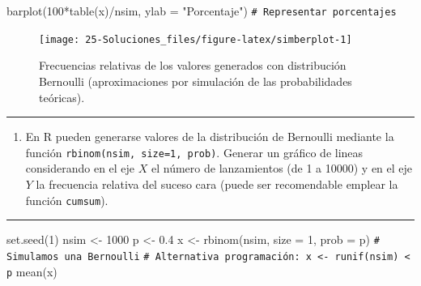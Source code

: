\documentclass[
]{book}
\newenvironment{Shaded}{\begin{snugshade}}{\end{snugshade}}
\newcommand{\AttributeTok}[1]{\textcolor[rgb]{0.77,0.63,0.00}{#1}}
\newcommand{\CommentTok}[1]{\textcolor[rgb]{0.56,0.35,0.01}{\textit{#1}}}
\newcommand{\DecValTok}[1]{\textcolor[rgb]{0.00,0.00,0.81}{#1}}
\newcommand{\FloatTok}[1]{\textcolor[rgb]{0.00,0.00,0.81}{#1}}
\newcommand{\FunctionTok}[1]{\textcolor[rgb]{0.00,0.00,0.00}{#1}}
\newcommand{\NormalTok}[1]{#1}
\newcommand{\OtherTok}[1]{\textcolor[rgb]{0.56,0.35,0.01}{#1}}
\newcommand{\SpecialCharTok}[1]{\textcolor[rgb]{0.00,0.00,0.00}{#1}}
\newcommand{\StringTok}[1]{\textcolor[rgb]{0.31,0.60,0.02}{#1}}
\providecommand{\tightlist}{%
  \setlength{\itemsep}{0pt}\setlength{\parskip}{0pt}}
\theoremstyle{break}
\theoremstyle{nonumberplain}
\renewcommand{\CommentTok}[1]{\textcolor[rgb]{0.41,0.41,0.41}{\texttt{#1}}}
\begin{document}
\begin{Shaded}
\begin{Highlighting}[]
\FunctionTok{barplot}\NormalTok{(}\DecValTok{100}\SpecialCharTok{*}\FunctionTok{table}\NormalTok{(x)}\SpecialCharTok{/}\NormalTok{nsim, }\AttributeTok{ylab =} \StringTok{"Porcentaje"}\NormalTok{) }\CommentTok{\# Representar porcentajes }
\end{Highlighting}
\end{Shaded}

\begin{figure}[!htb]

{\centering \texttt{[image: 25-Soluciones\_files/figure-latex/simberplot-1]} 

}

\caption{Frecuencias relativas de los valores generados con distribución Bernoulli (aproximaciones por simulación de las probabilidades teóricas).}\label{fig:simberplot}
\end{figure}

\begin{center}\rule{0.5\linewidth}{0.5pt}\end{center}

\begin{enumerate}
\def\labelenumi{\alph{enumi})}
\setcounter{enumi}{1}
\tightlist
\item
  En R pueden generarse valores de la distribución de Bernoulli
  mediante la función \texttt{rbinom(nsim,\ size=1,\ prob)}. Generar un
  gráfico de lineas considerando en el eje \(X\) el número de
  lanzamientos (de 1 a 10000) y en el eje \(Y\) la frecuencia
  relativa del suceso cara (puede ser recomendable emplear la
  función \texttt{cumsum}).
\end{enumerate}

\begin{center}\rule{0.5\linewidth}{0.5pt}\end{center}

\begin{Shaded}
\begin{Highlighting}[]
\FunctionTok{set.seed}\NormalTok{(}\DecValTok{1}\NormalTok{)}
\NormalTok{nsim }\OtherTok{\textless{}{-}} \DecValTok{1000}
\NormalTok{p }\OtherTok{\textless{}{-}} \FloatTok{0.4}
\NormalTok{x }\OtherTok{\textless{}{-}} \FunctionTok{rbinom}\NormalTok{(nsim, }\AttributeTok{size =} \DecValTok{1}\NormalTok{, }\AttributeTok{prob =}\NormalTok{ p) }\CommentTok{\# Simulamos una Bernoulli}
\CommentTok{\# Alternativa programación: x \textless{}{-} runif(nsim) \textless{} p}
\FunctionTok{mean}\NormalTok{(x)}
\end{Highlighting}
\end{Shaded}
\end{document}
